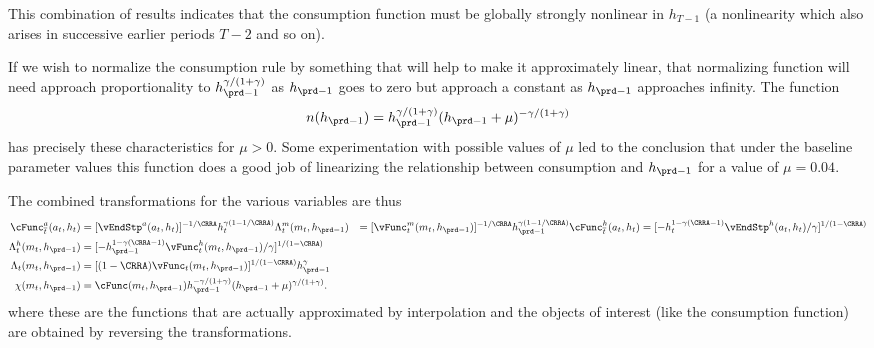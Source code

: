 \documentclass[\econtexRoot/SolvingMicroDSOPs]{subfiles}
\begin{document}
This combination of results indicates that the consumption function
must be globally strongly nonlinear in $h_{T-1}$ (a nonlinearity which
also arises in successive earlier periods $T-2$ and so on).

If we wish to normalize the consumption rule by something that will
help to make it approximately linear, that normalizing function will
need approach proportionality to $h_{\prd-1}^{\gamma/(1+\gamma)}$ as
$h_{\prd-1}$ goes to zero but approach a constant as $h_{\prd-1}$ approaches
infinity.  The function
\begin{equation}
  n(h_{\prd-1}) =
  h_{\prd-1}^{\gamma/(1+\gamma)}(h_{\prd-1}+\mu)^{-\gamma/(1+\gamma)}
\end{equation}
has precisely these characteristics for $\mu>0$.  Some
experimentation with possible values of $\mu$ led to the conclusion
that under the baseline parameter values this function does a good job
of linearizing the relationship between consumption and $h_{\prd-1}$ for
a value of $\mu = 0.04$.

The combined transformations for the various variables are thus
\begin{equation}\begin{gathered}\begin{aligned}
  \cFunc_{\overline{t}}^{a}(a_{t},h_{t})        & = [\vEndStp^{a}(a_{t},h_{t})]^{-1/\CRRA} h_{t}^{\gamma(1-1/\CRRA)} %
  \Lambda_{t}^{m}(m_{t},h_{\prd-1})   & = [{\vFunc}_{t}^{m}(m_{t},h_{\prd-1})]^{-1/\CRRA} h_{\prd-1}^{\gamma(1-1/\CRRA)} %
  \cFunc_{\overline{t}}^{h}(a_{t},h_{t})
                                                    & =                                                  [-h_{t}^{1-\gamma(\CRRA-1)}\vEndStp^{h}(a_{t},h_{t})/\gamma]^{1/(1-\CRRA)}  \label{eq:vEndhtransform}
  \\      \Lambda_{t}^{h}(m_{t},h_{\prd-1})   & = [-h_{\prd-1}^{1-\gamma(\CRRA-1)}\vFunc_{t}^{h}(m_{t},h_{\prd-1})/\gamma]^{1/(1-\CRRA)} %
  \\      \Lambda_{t}(m_{t},h_{\prd-1})       & = [(1-\CRRA)
                                               \vFunc_{t}(m_{t},h_{\prd-1})]^{1/(1-\CRRA)} h_{\prd-1}^{\gamma} %
  \\  \chi(m_{t},h_{\prd-1})       & = \cFunc(m_{t},h_{\prd-1})h_{\prd-1}^{-\gamma/(1+\gamma)}(h_{\prd-1}+\mu)^{\gamma/(1+\gamma)}.
\end{aligned}\end{gathered}\end{equation}
where these are the functions that are actually approximated by
interpolation and the objects of interest (like the consumption
function) are obtained by reversing the transformations.
\end{document}
